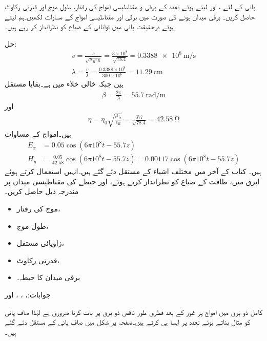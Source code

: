 پانی کے لئے ،  اور  لیتے ہوئے  تعدد کے برقی و مقناطیسی امواج کی رفتار، طول موج اور قدرتی رکاوٹ حاصل کریں۔ برقی میدان  ہونے کی صورت میں برقی اور مقناطیسی امواج کے مساوات لکھیں۔ہم  لیتے ہوئے درحقیقت پانی میں توانائی کے ضیاع کو نظرانداز کر رہے ہیں۔

حل:
\begin{align*}
v=\frac{c}{\sqrt{\mu_R \epsilon_R}}=\frac{3 \times 10^8}{\sqrt{78.4}}=\SI{0.3388e8}{\meter \per \second}\\
\lambda=\frac{v}{f}=\frac{0.3388 \times 10^8}{300 \times 10^6}=\SI{11.29}{\centi\meter}
\end{align*}
ہیں جبکہ خالی خلاء میں  ہے۔بقایا مستقل
\begin{align*}
\beta=\frac{2\pi}{\lambda}=\SI{55.7}{\radian \per \meter}
\end{align*}
اور
\begin{align*}
\eta=\eta_0 \sqrt{\frac{\mu_R}{\epsilon_R}}=\frac{377}{\sqrt{78.4}}=\SI{42.58}{\ohm}
\end{align*}
ہیں۔امواج کے مساوات
\begin{align*}
E_x&=0.05 \cos (6\pi 10^8 t -55.7 z)\\
H_y&=\frac{0.05}{42.58} \cos (6\pi 10^8 t -55.7 z)=0.00117 \cos (6\pi 10^8 t -55.7 z)
\end{align*}
ہیں۔
کتاب کے آخر میں مختلف اشیاء کے مستقل دئے گئے ہیں۔انہیں استعمال کرتے ہوئے  ابرق میں، طاقت کے ضیاع کو نظرانداز کرتے ہوئے،   اور  حیطے  کی مقناطیسی میدان پر مندرجہ ذیل حاصل کریں۔
\begin{itemize}
\item
موج کی رفتار،
\item
طول موج،
\item
زاویائی مستقل،
\item
قدرتی رکاوٹ،
\item
برقی میدان کا حیطہ۔
\end{itemize} 

جوابات:، ، ،  اور 

کامل ذو برق میں امواج پر غور کے بعد فطری طور ناقص ذو برق پر بات کرنا ضروری ہے لہٰذا صاف پانی کو مثال بناتے ہوئے    تعدد پر  ایسا ہی کرتے ہیں۔صفحہ  پر شکل  میں صاف پانی کے مستقل دئے گئے ہیں۔

